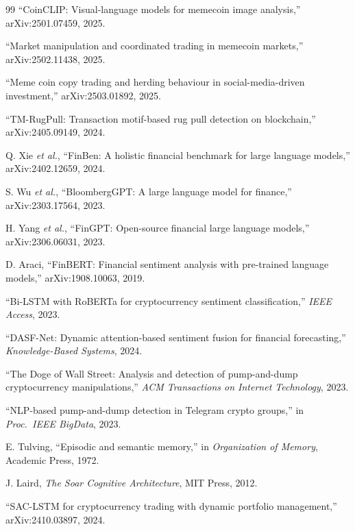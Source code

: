 \documentclass[12pt,a4paper,oneside,openany]{book}
\begin{document}
\begin{itemize}[leftmargin=8mm]
\begin{thebibliography}{99}
 ``CoinCLIP: Visual-language models for memecoin image analysis,'' arXiv:2501.07459, 2025.

 ``Market manipulation and coordinated trading in memecoin markets,'' arXiv:2502.11438, 2025.

 ``Meme coin copy trading and herding behaviour in social-media-driven investment,'' arXiv:2503.01892, 2025.

 ``TM-RugPull: Transaction motif-based rug pull detection on blockchain,'' arXiv:2405.09149, 2024.

 Q. Xie \textit{et al.}, ``FinBen: A holistic financial benchmark for large language models,'' arXiv:2402.12659, 2024.

 S. Wu \textit{et al.}, ``BloombergGPT: A large language model for finance,'' arXiv:2303.17564, 2023.

 H. Yang \textit{et al.}, ``FinGPT: Open-source financial large language models,'' arXiv:2306.06031, 2023.

 D. Araci, ``FinBERT: Financial sentiment analysis with pre-trained language models,'' arXiv:1908.10063, 2019.

 ``Bi-LSTM with RoBERTa for cryptocurrency sentiment classification,'' \textit{IEEE Access}, 2023.

 ``DASF-Net: Dynamic attention-based sentiment fusion for financial forecasting,'' \textit{Knowledge-Based Systems}, 2024.

 ``The Doge of Wall Street: Analysis and detection of pump-and-dump cryptocurrency manipulations,'' \textit{ACM Transactions on Internet Technology}, 2023.

 ``NLP-based pump-and-dump detection in Telegram crypto groups,'' in \textit{Proc.\ IEEE BigData}, 2023.

 E. Tulving, ``Episodic and semantic memory,'' in \textit{Organization of Memory}, Academic Press, 1972.

 J. Laird, \textit{The Soar Cognitive Architecture}, MIT Press, 2012.

 ``SAC-LSTM for cryptocurrency trading with dynamic portfolio management,'' arXiv:2410.03897, 2024.

\end{thebibliography}

\clearpage
\thispagestyle{plain}


\end{itemize}
\end{document}
